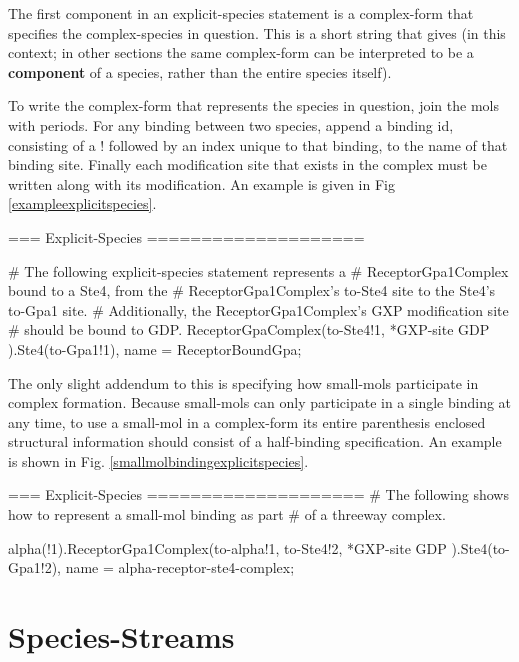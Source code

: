 The first component in an explicit-species statement is a complex-form
that specifies the complex-species in question.  This is a short
string that gives (in this context; in other sections the same
complex-form can be interpreted to be a {\bf component} of a species,
rather than the entire species itself).  

To write the complex-form that represents the species in question,
join the mols with periods.  For any binding between two species,
append a binding id, consisting of a ! followed by an index unique to
that binding, to the name of that binding site.  Finally each
modification site that exists in the complex must be written along
with its modification.  An example is given in Fig \ref{exampleexplicitspecies}.

\begin{ExampleXML}[label=exampleexplicitspecies]
=== Explicit-Species ====================

    # The following explicit-species statement represents a
    # ReceptorGpa1Complex bound to a Ste4, from the
    # ReceptorGpa1Complex's to-Ste4 site to the Ste4's to-Gpa1 site.
    # Additionally, the ReceptorGpa1Complex's GXP modification site
    # should be bound to GDP.
    ReceptorGpaComplex(to-Ste4!1, *GXP-site { GDP } ).Ste4(to-Gpa1!1), 
        name = ReceptorBoundGpa;

\end{ExampleXML}


The only slight addendum to this is specifying how small-mols
participate in complex formation.  Because small-mols can only
participate in a single binding at any time, to use a small-mol in a
complex-form its entire parenthesis enclosed structural information
should consist of a half-binding specification.  An example is shown
in Fig. \ref{smallmolbindingexplicitspecies}.

\begin{ExampleXML}[label=smallmolbindingexplicitspecies]
=== Explicit-Species ====================
    # The following shows how to represent a small-mol binding as part
    # of a threeway complex.
    
    alpha(!1).ReceptorGpa1Complex(to-alpha!1, to-Ste4!2, *GXP-site {GDP} ).Ste4(to-Gpa1!2),
        name = alpha-receptor-ste4-complex;

\end{ExampleXML}

\section{Species-Streams}

